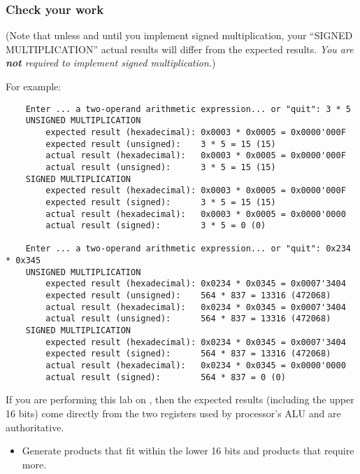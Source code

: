 \subsubsection*{Check your work}

\begin{description}
\end{description}
(Note that unless and until you implement signed multiplication, your ``SIGNED MULTIPLICATION'' actual results will differ from the expected results.
\textit{You are \textbf{not} required to implement signed multiplication.})

For example:
\begin{verbatim}
    Enter ... a two-operand arithmetic expression... or "quit": 3 * 5
    UNSIGNED MULTIPLICATION
        expected result (hexadecimal): 0x0003 * 0x0005 = 0x0000'000F
        expected result (unsigned):    3 * 5 = 15 (15)
        actual result (hexadecimal):   0x0003 * 0x0005 = 0x0000'000F
        actual result (unsigned):      3 * 5 = 15 (15)
    SIGNED MULTIPLICATION
        expected result (hexadecimal): 0x0003 * 0x0005 = 0x0000'000F
        expected result (signed):      3 * 5 = 15 (15)
        actual result (hexadecimal):   0x0003 * 0x0005 = 0x0000'0000
        actual result (signed):        3 * 5 = 0 (0)

    Enter ... a two-operand arithmetic expression... or "quit": 0x234 * 0x345
    UNSIGNED MULTIPLICATION
        expected result (hexadecimal): 0x0234 * 0x0345 = 0x0007'3404
        expected result (unsigned):    564 * 837 = 13316 (472068)
        actual result (hexadecimal):   0x0234 * 0x0345 = 0x0007'3404
        actual result (unsigned):      564 * 837 = 13316 (472068)
    SIGNED MULTIPLICATION
        expected result (hexadecimal): 0x0234 * 0x0345 = 0x0007'3404
        expected result (signed):      564 * 837 = 13316 (472068)
        actual result (hexadecimal):   0x0234 * 0x0345 = 0x0000'0000
        actual result (signed):        564 * 837 = 0 (0)
\end{verbatim}

If you are performing this lab on \runtimeenvironment, then the expected results (including the upper 16 bits) come directly from the two registers used by processor's ALU and are authoritative.

\begin{description}
    \begin{itemize}
        \item Generate products that fit within the lower 16 bits and products that require more.
    \end{itemize}
\end{description}


